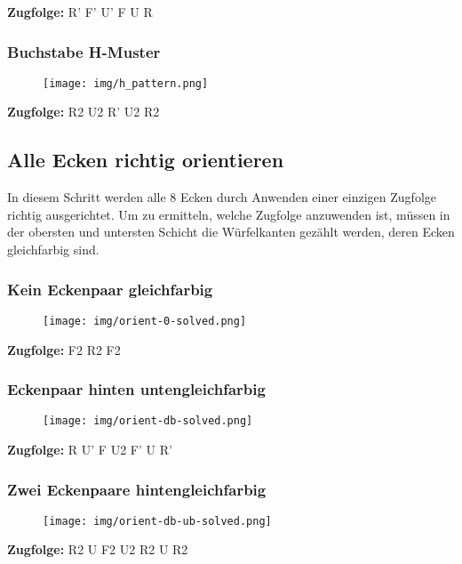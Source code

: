 \documentclass[letterpaper,10pt,twoside,twocolumn,openany]{book}
\begin{document}
\centering \textbf{Zugfolge:} R' F' U' F U R

\subsubsection{Buchstabe H-Muster}
\begin{figure}[!htb] 
  \centering
     \texttt{[image: img/h\_pattern.png]}
\end{figure}
\centering \textbf{Zugfolge:} R2 U2 R' U2 R2

\subsection{Alle Ecken richtig \newline orientieren}
\begin{justify}
In diesem Schritt werden alle 8 Ecken durch Anwenden einer einzigen Zugfolge richtig ausgerichtet. Um zu ermitteln, welche Zugfolge anzuwenden ist, müssen in der obersten und untersten Schicht die Würfelkanten gezählt werden, deren Ecken gleichfarbig sind. 
\end{justify}

\subsubsection{Kein Eckenpaar gleichfarbig}
\begin{figure}[!htb] 
  \centering
     \texttt{[image: img/orient-0-solved.png]}
\end{figure}
\centering \textbf{Zugfolge:} F2 R2 F2
        
\subsubsection{Eckenpaar hinten unten\newline gleichfarbig}
\begin{figure}[!htb] 
  \centering
     \texttt{[image: img/orient-db-solved.png]}
\end{figure}
\centering \textbf{Zugfolge:} R U' F U2 F' U R'

\subsubsection{Zwei Eckenpaare hinten\newline gleichfarbig}
\begin{figure}[!htb] 
  \centering
     \texttt{[image: img/orient-db-ub-solved.png]}
\end{figure}
\centering \textbf{Zugfolge:} R2 U F2 U2 R2 U R2 
\end{document}
